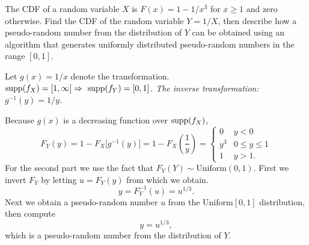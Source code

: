\begin{exercise}
\begin{questions}
\question %
The CDF of a random variable $X$ is $F(x) = 1-1/x^3$ for $x\geq 1$ and zero otherwise.
Find the CDF of the random variable $Y=1/X$, then describe how a pseudo-random number from the distribution of $Y$ can be obtained using an algorithm that generates uniformly distributed pseudo-random numbers in the range $[0,1]$.
\begin{answer}
Let $g(x) = 1/x$ denote the transformation. 
\bit
\it $\text{supp}(f_X) = [1,\infty] \Rightarrow\ \text{supp}(f_Y) = [0,1]$.
\it The inverse transformation: $g^{-1}(y) = 1/y$.
\eit
\par
Because $g(x)$ is a decreasing function over $\text{supp}(f_X)$,
\[
F_Y(y) 
	= 1 - F_X\big[g^{-1}(y)\big]
	= 1 - F_X\left(\frac{1}{y}\right)
	= \left\{\begin{array}{ll}
		0	& y < 0 \\
		y^3	& 0\leq y\leq 1 \\
		1	& y > 1.
	\end{array}\right.
\]
For the second part we use the fact that $F_Y(Y)\sim\text{Uniform}(0,1)$. First we invert $F_Y$ by letting $u=F_Y(y)$ from which we obtain.
\[
y = F_Y^{-1}(u) = u^{1/3}.
\]
Next we obtain a pseudo-random number $u$ from the $\text{Uniform}[0,1]$ distribution, then compute
\[
y = u^{1/3},
\]
which is a pseudo-random number from the distribution of $Y$.
\end{answer}

\end{questions}
\end{exercise}
